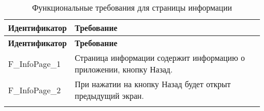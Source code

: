 \documentclass[a4paper, 14pt]{article}
\begin{document}
\begin{longtable}{| p{} | p{} |}
    \hline
    \textbf{Идентификатор}          & \textbf{Требование}                                                                                                                                                                \\
    \hline
    \endfirsthead
    \hline
    \textbf{Идентификатор}          & \textbf{Требование}                                                                                                                                                                \\
    \hline
    \endhead

    F\_InfoPage\_1                  & Страница информации содержит информацию о приложении, кнопку Назад.                                                                                                                \\ \hline
    F\_InfoPage\_2                  & При нажатии на кнопку Назад будет открыт предыдущий экран.                                                                                                                         \\ \hline

    \caption{Функциональные требования для страницы информации}
\end{longtable}
\end{document}
